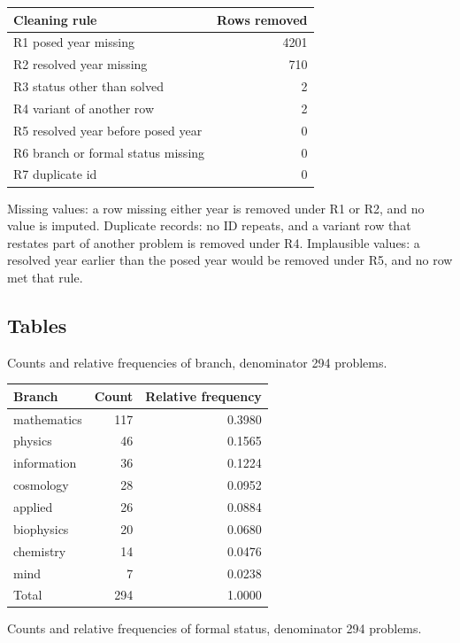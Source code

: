 \documentclass[11pt]{article}
\begin{document}
\begin{center}\begin{tabular}{lr}
\toprule
Cleaning rule & Rows removed \\
\midrule
R1 posed year missing & 4201 \\
R2 resolved year missing & 710 \\
R3 status other than solved & 2 \\
R4 variant of another row & 2 \\
R5 resolved year before posed year & 0 \\
R6 branch or formal status missing & 0 \\
R7 duplicate id & 0 \\
\bottomrule
\end{tabular}\end{center}

Missing values: a row missing either year is removed under R1 or R2, and no value is imputed. Duplicate records: no ID repeats, and a variant row that restates part of another problem is removed under R4. Implausible values: a resolved year earlier than the posed year would be removed under R5, and no row met that rule.

\subsection{Tables}

Counts and relative frequencies of branch, denominator 294 problems.

\begin{center}\begin{tabular}{lrr}
\toprule
Branch & Count & Relative frequency \\
\midrule
mathematics & 117 & 0.3980 \\
physics & 46 & 0.1565 \\
information & 36 & 0.1224 \\
cosmology & 28 & 0.0952 \\
applied & 26 & 0.0884 \\
biophysics & 20 & 0.0680 \\
chemistry & 14 & 0.0476 \\
mind & 7 & 0.0238 \\
Total & 294 & 1.0000 \\
\bottomrule
\end{tabular}\end{center}

Counts and relative frequencies of formal status, denominator 294 problems.
\end{document}
